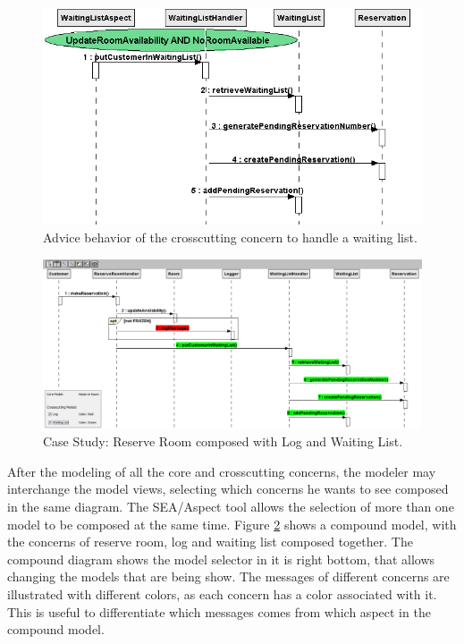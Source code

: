   \begin{figure}
	\centering
	\includegraphics[scale=0.6]{img/case_study_behavioral_waiting_list.png}
	\caption{Advice behavior of the crosscutting concern to handle a waiting list.}\label{fig:case_study_behavioral_waiting_list}
  \end{figure}
  
   \begin{figure}
	\centering
	\includegraphics[scale=0.4]{img/case_study_compound_2.png}
	\caption{Case Study: Reserve
	Room composed with Log and Waiting List.}\label{fig:case_study_compound_2}
  \end{figure}
  
After the modeling of all the core and crosscutting concerns, the modeler may interchange the model views, selecting which concerns he wants to see
composed in the same diagram. The SEA/Aspect tool allows the selection of more than one model to be composed at the same time. Figure
\ref{fig:case_study_compound_2} shows a compound model, with the concerns of reserve room, log and waiting list composed together. The compound
diagram shows the model selector in it is right bottom, that allows changing the models that are being show. The messages of different concerns are
illustrated with different colors, as each concern has a color associated with it. This is useful to differentiate which messages comes from which
aspect in the compound model.